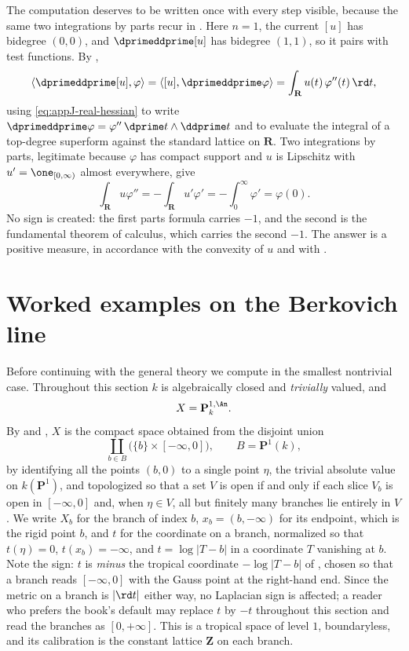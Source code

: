 The computation deserves to be written once with every step visible, because
the same two integrations by parts recur in
.  Here $n=1$, the
current $[u]$ has bidegree $(0,0)$, and
$\dprimeddprime[u]$ has bidegree $(1,1)$, so it pairs with test functions.
By ,
\[
 \langle\dprimeddprime[u],\varphi\rangle
 =\langle[u],\dprimeddprime\varphi\rangle
 =\int_{\mathbf R}u(t)\,\varphi''(t)\,\rd t,
\]
using \eqref{eq:appJ-real-hessian} to write
$\dprimeddprime\varphi=\varphi''\,\dprime t\wedge\ddprime t$ and
 to evaluate the integral of a top-degree
superform against the standard lattice on $\mathbf R$.  Two integrations by
parts, legitimate because $\varphi$ has compact support and $u$ is Lipschitz
with $u'=\one_{[0,\infty)}$ almost everywhere, give
\[
 \int_{\mathbf R}u\varphi''
 =-\int_{\mathbf R}u'\varphi'
 =-\int_0^{\infty}\varphi'
 =\varphi(0).
\]
No sign is created: the first parts formula carries $-1$, and the second is
the fundamental theorem of calculus, which carries the second $-1$.  The
answer is a positive measure, in accordance with the convexity of $u$ and
with .

\section{Worked examples on the Berkovich line}
\label{sec:ch14-line-examples}

Before continuing with the general theory we compute in the smallest
nontrivial case.  Throughout this section $k$ is algebraically closed and
\emph{trivially} valued, and
\[
 X=\mathbf P^{1,\An}_k .
\]
By  and , $X$ is the compact space
obtained from the disjoint union
\[
 \coprod_{b\in B}\bigl(\{b\}\times[-\infty,0]\bigr),
 \qquad B=\mathbf P^1(k),
\]
by identifying all the points $(b,0)$ to a single point $\eta$, the trivial
absolute value on $k(\mathbf P^1)$, and topologized so that a set $V$ is open
if and only if each slice $V_b$ is open in $[-\infty,0]$ and, when
$\eta\in V$, all but finitely many branches lie entirely in $V$.  We write
$X_b$ for the branch of index $b$, $x_b=(b,-\infty)$ for its endpoint, which
is the rigid point $b$, and $t$ for the coordinate on a branch, normalized so
that $t(\eta)=0$, $t(x_b)=-\infty$, and $t=\log|T-b|$ in a coordinate $T$
vanishing at $b$.  Note the sign: $t$ is \emph{minus} the tropical coordinate
$-\log|T-b|$ of , chosen so that a branch reads
$[-\infty,0]$ with the Gauss point at the right-hand end.  Since the metric on
a branch is $|\rd t|$ either way, no Laplacian sign is affected; a reader who
prefers the book's default may replace $t$ by $-t$ throughout this section and
read the branches as $[0,+\infty]$.
This is a tropical space of level $1$, boundaryless, and its calibration is
the constant lattice $\mathbf Z$ on each branch.

